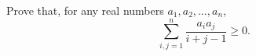 Prove that, for any real numbers $a_1, a_2, \dots , a_n$, \[ \sum_{i,j=1}^n \frac{a_ia_j}{i+j-1}\ge 0.\]